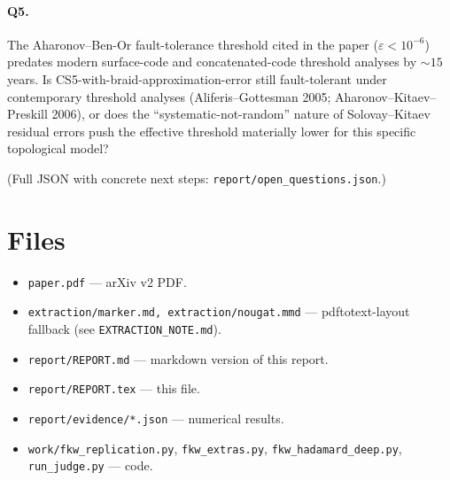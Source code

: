 \documentclass[11pt]{article}
\begin{document}
\paragraph{Q5.} The Aharonov--Ben-Or fault-tolerance threshold cited in the paper ($\varepsilon < 10^{-6}$) predates modern surface-code and concatenated-code threshold analyses by $\sim 15$ years. Is CS5-with-braid-approximation-error still fault-tolerant under contemporary threshold analyses (Aliferis--Gottesman 2005; Aharonov--Kitaev--Preskill 2006), or does the ``systematic-not-random'' nature of Solovay--Kitaev residual errors push the effective threshold materially lower for this specific topological model?

\medskip
(Full JSON with concrete next steps: \texttt{report/open\_questions.json}.)

\section*{Files}

\begin{itemize}
  \item \texttt{paper.pdf} --- arXiv v2 PDF.
  \item \texttt{extraction/marker.md, extraction/nougat.mmd} --- pdftotext-layout fallback (see \texttt{EXTRACTION\_NOTE.md}).
  \item \texttt{report/REPORT.md} --- markdown version of this report.
  \item \texttt{report/REPORT.tex} --- this file.
  \item \texttt{report/evidence/*.json} --- numerical results.
  \item \texttt{work/fkw\_replication.py}, \texttt{fkw\_extras.py}, \texttt{fkw\_hadamard\_deep.py}, \texttt{run\_judge.py} --- code.
\end{itemize}
\end{document}
